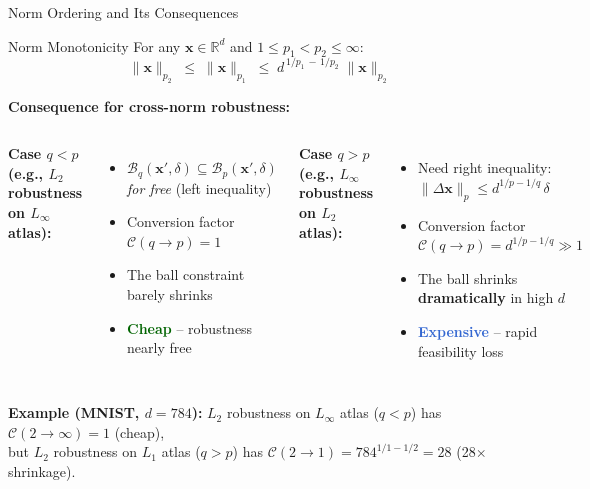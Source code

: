 \documentclass[aspectratio=169, 10pt]{beamer}
\newcommand{\vx}{\mathbf{x}}
\newcommand{\R}{\mathbb{R}}
\newcommand{\Bp}{\mathcal{B}_p}
\newcommand{\Bq}{\mathcal{B}_q}
\begin{document}
\begin{frame}{Norm Ordering and Its Consequences}

\begin{block}{Norm Monotonicity}
For any $\vx \in \R^d$ and $1 \leq p_1 < p_2 \leq \infty$:
\[
  \boxed{\|\vx\|_{p_2} \;\leq\; \|\vx\|_{p_1} \;\leq\; d^{\,1/p_1\,-\,1/p_2}\;\|\vx\|_{p_2}}
\]
\end{block}

\textbf{Consequence for cross-norm robustness:}

\medskip

\begin{columns}[T]
\textbf{Case $q < p$ (e.g., $L_2$ robustness on $L_\infty$ atlas):}
\begin{itemize}
  \item $\Bq(\vx', \delta) \subseteq \Bp(\vx', \delta)$ \emph{for free} (left inequality)
  \item Conversion factor $\mathcal{C}(q\!\to\!p) = 1$
  \item The ball constraint barely shrinks
  \item[$\Rightarrow$] \textcolor{darkgreen}{\textbf{Cheap}} -- robustness nearly free
\end{itemize}

\textbf{Case $q > p$ (e.g., $L_\infty$ robustness on $L_2$ atlas):}
\begin{itemize}
  \item Need right inequality: $\|\Delta\vx\|_p \leq d^{1/p - 1/q}\,\delta$
  \item Conversion factor $\mathcal{C}(q\!\to\!p) = d^{1/p - 1/q} \gg 1$
  \item The ball shrinks \textbf{dramatically} in high $d$
  \item[$\Rightarrow$] \textcolor{highlight}{\textbf{Expensive}} -- rapid feasibility loss
\end{itemize}
\end{columns}

\bigskip

\textbf{Example (MNIST, $d=784$):} $L_2$ robustness on $L_\infty$ atlas ($q<p$) has $\mathcal{C}(2\!\to\!\infty)=1$ (cheap),\\
but $L_2$ robustness on $L_1$ atlas ($q>p$) has $\mathcal{C}(2\!\to\!1) = 784^{1/1 - 1/2} = 28$ (28$\times$ shrinkage).

\end{frame}
\end{document}

